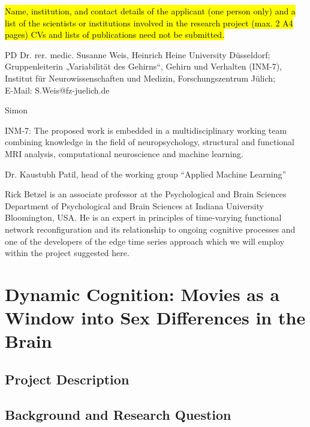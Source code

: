 \documentclass[11pt,a4paper]{article}
\begin{document}
\hl{Name, institution, and contact details of the applicant (one person only) and a list of the scientists or institutions involved in the research project (max. 2 A4 pages)
CVs and lists of publications need not be submitted.}

PD Dr. rer. medic. Susanne Weis, Heinrich Heine University Düsseldorf; \\
Gruppenleiterin „Variabilität des Gehirns“, Gehirn und Verhalten (INM-7), Institut für Neurowissenschaften und Medizin,  
Forschungszentrum Jülich; \\
E-Mail: S.Weis@fz-juelich.de

Simon

INM-7: The proposed work is embedded in a multidisciplinary working team combining knowledge in the field of neuropsychology, structural and functional MRI analysis, computational neuroscience and machine learning. 

Dr. Kaustubh Patil, head of the working group “Applied Machine Learning”

Rick Betzel is an associate professor at the Psychological and Brain Sciences Department of Psychological and Brain Sciences at Indiana University Bloomington, USA. He is an expert in principles of time-varying functional network reconfiguration and its relationship to ongoing cognitive processes and one of the developers of the edge time series approach which we will employ within the project suggested here. 


\newpage

\section*{\Large\textbf{Dynamic Cognition: Movies as a Window into Sex Differences in the Brain}}
\hfill

\subsection*{Project Description} 
\subsection*{Background and Research Question} 
\end{document}
